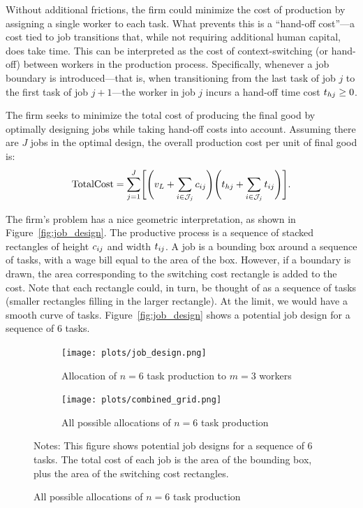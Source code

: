\documentclass{article}
\theoremstyle{plain}
\theoremstyle{plain}
\begin{document}
Without additional frictions, the firm could minimize the cost of production by assigning a single worker to each task.
What prevents this is a ``hand-off cost''---a cost tied to job transitions that, while not requiring additional human capital, does take time.
This can be interpreted as the cost of context-switching (or hand-off) between workers in the production process.
Specifically, whenever a job boundary is introduced---that is, when transitioning from the last task of job $j$ to the first task of job $j+1$---the worker in job $j$ incurs a hand-off time cost $t_{hj} \geq 0$.

The firm seeks to minimize the total cost of producing the final good by optimally designing jobs while taking hand-off costs into account.
Assuming there are $J$ jobs in the optimal design, the overall production cost per unit of final good is:
\[
\text{TotalCost} = \sum_{j=1}^J \Biggl[\Biggl(v_L + \sum_{i \in \mathcal{J}_j} c_{ij} \Biggr) \Biggl(t_{hj} + \sum_{i \in \mathcal{J}_j} t_{ij} \Biggr)\Biggr].
\]

The firm's problem has a nice geometric interpretation, as shown in Figure~\ref{fig:job_design}.
The productive process is a sequence of stacked rectangles of height $c_{ij}$ and width $t_{ij}$.
A job is a bounding box around a sequence of tasks, with a wage bill equal to the area of the box.
However, if a boundary is drawn, the area corresponding to the switching cost rectangle is added to the cost.
Note that each rectangle could, in turn, be thought of as a sequence of tasks (smaller rectangles filling in the larger rectangle).
At the limit, we would have a smooth curve of tasks.
Figure~\ref{fig:job_design} shows a potential job design for a sequence of 6 tasks.
\begin{figure}[htbp]
  \begin{center}
  \caption{Example allocations of workers to tasks when $n = 6$} \label{fig:job_design}
  \begin{subfigure}[b]{0.48\textwidth}
    \texttt{[image: plots/job\_design.png]}
    \caption{Allocation of $n=6$ task production to $m = 3$ workers}
  \end{subfigure}
  \hfill
  \begin{subfigure}[b]{0.48\textwidth}
    \texttt{[image: plots/combined\_grid.png]}
    \caption{All possible allocations of $n=6$ task production}
  \end{subfigure}
  \end{center}
  \footnotesize{Notes: This figure shows potential job designs for a sequence of 6 tasks.
  The total cost of each job is the area of the bounding box, plus the area of the switching cost rectangles.
  }
\end{figure}
\end{document}
